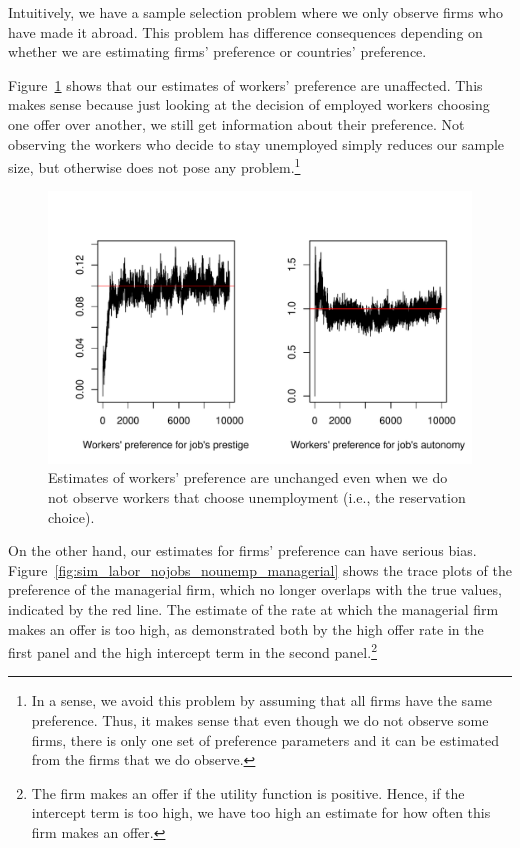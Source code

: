 Intuitively, we have a sample selection problem where we only observe firms who
have made it abroad. This problem has difference consequences depending on
whether we are estimating firms' preference or countries' preference.

Figure~\ref{fig:sim_labor_nojobs_nounemp_alpha} shows that our estimates of
workers' preference are unaffected. This makes sense because just looking at the
decision of employed workers choosing one offer over another, we
still get information about their preference. Not observing the workers who
decide to stay unemployed simply reduces our sample size, but otherwise does not
pose any problem.\footnote{In a sense, we avoid this problem by assuming that
  all firms have the same preference. Thus, it makes sense that even though we
  do not observe some firms, there is only one set of preference parameters and
  it can be estimated from the firms that we do observe.}

\begin{figure}[tbp]
  \centering
  \includegraphics[width=\textwidth,keepaspectratio]{../figure/sim_labor_nojobs_nounemp_alpha}
  \caption[Estimates of workers' preference when the reservation choice is
  unobserved]{Estimates of workers' preference are unchanged even when we do not
    observe workers that choose unemployment (i.e., the reservation choice).}
  \label{fig:sim_labor_nojobs_nounemp_alpha}
\end{figure}

On the other hand, our estimates for firms' preference can have serious bias.
Figure~\ref{fig:sim_labor_nojobs_nounemp_managerial} shows the trace plots of
the preference of the managerial firm, which no longer overlaps with the true
values, indicated by the red line. The estimate of the rate at which the
managerial firm makes an offer is too high, as demonstrated both by the high
offer rate in the first panel and the high intercept term in the second
panel.\footnote{The firm makes an offer if the utility function is positive.
  Hence, if the intercept term is too high, we have too high an estimate for how
often this firm makes an offer.}  

